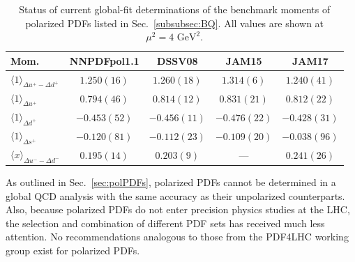 \begin{table}[!t]
\centering
\renewcommand{\arraystretch}{1.2}
\begin{tabular}{lcccc}
\toprule
Mom. 
& NNPDFpol1.1 & DSSV08 & JAM15 & JAM17 \\
\midrule
$\langle 1 \rangle_{\Delta u^+-\Delta d^+}$ &
$1.250(16)$ & $1.260(18)$ & $1.314(6)$  & $1.240(41)$\\
$\langle 1 \rangle_{\Delta u^+}$ &
$0.794(46)$ & $0.814(12)$ & $0.831(21)$ & $0.812(22)$\\
$\langle 1 \rangle_{\Delta d^+}$ &  
$-0.453(52)$  &  $-0.456(11)$ &  $-0.476(22)$ &  $-0.428(31)$\\
$\langle 1 \rangle_{\Delta s^+}$ &  
$-0.120(81)$  &  $-0.112(23)$ &  $-0.109(20)$ &  $-0.038(96)$\\
$\langle x \rangle_{\Delta u^- - \Delta d^-}$ &     
$0.195(14)$ &  $0.203(9)$ &  ---        & $0.241(26)$ \\
\bottomrule
\end{tabular}
\caption{\small Status of current global-fit determinations of the 
benchmark moments of polarized PDFs listed in Sec.~\ref{subsubsec:BQ}.
All values are shown at $\mu^2=4\mbox{ GeV}^2$.}
\label{tab:polPDFmoms}
\end{table}

As outlined in Sec.~\ref{sec:polPDFs}, polarized PDFs cannot be determined in 
a global QCD analysis with the same accuracy as their unpolarized counterparts.
%
Also, because polarized PDFs do not enter precision physics studies at the LHC, 
the selection and combination of different PDF sets has received much less
attention.
%
No recommendations analogous to those from the PDF4LHC working group
exist for polarized PDFs.

